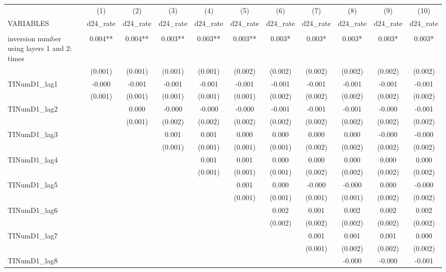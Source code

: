 \begin{tabular}{lcccccccccc} \hline
 & (1) & (2) & (3) & (4) & (5) & (6) & (7) & (8) & (9) & (10) \\
VARIABLES & d24\_rate & d24\_rate & d24\_rate & d24\_rate & d24\_rate & d24\_rate & d24\_rate & d24\_rate & d24\_rate & d24\_rate \\ \hline
 &  &  &  &  &  &  &  &  &  &  \\
inversion number using layers 1 and 2: times & 0.004** & 0.004** & 0.003** & 0.003** & 0.003** & 0.003* & 0.003* & 0.003* & 0.003* & 0.003* \\
 & (0.001) & (0.001) & (0.001) & (0.001) & (0.002) & (0.002) & (0.002) & (0.002) & (0.002) & (0.002) \\
TINumD1\_lag1 & -0.000 & -0.001 & -0.001 & -0.001 & -0.001 & -0.001 & -0.001 & -0.001 & -0.001 & -0.001 \\
 & (0.001) & (0.001) & (0.001) & (0.001) & (0.001) & (0.002) & (0.002) & (0.002) & (0.002) & (0.002) \\
TINumD1\_lag2 &  & 0.000 & -0.000 & -0.000 & -0.000 & -0.001 & -0.001 & -0.001 & -0.000 & -0.001 \\
 &  & (0.001) & (0.002) & (0.002) & (0.002) & (0.002) & (0.002) & (0.002) & (0.002) & (0.002) \\
TINumD1\_lag3 &  &  & 0.001 & 0.001 & 0.000 & 0.000 & 0.000 & 0.000 & -0.000 & -0.000 \\
 &  &  & (0.001) & (0.001) & (0.001) & (0.001) & (0.002) & (0.002) & (0.002) & (0.002) \\
TINumD1\_lag4 &  &  &  & 0.001 & 0.001 & 0.000 & 0.000 & 0.000 & 0.000 & 0.000 \\
 &  &  &  & (0.001) & (0.001) & (0.001) & (0.002) & (0.002) & (0.002) & (0.002) \\
TINumD1\_lag5 &  &  &  &  & 0.001 & 0.000 & -0.000 & -0.000 & 0.000 & -0.000 \\
 &  &  &  &  & (0.001) & (0.001) & (0.001) & (0.001) & (0.002) & (0.002) \\
TINumD1\_lag6 &  &  &  &  &  & 0.002 & 0.001 & 0.002 & 0.002 & 0.002 \\
 &  &  &  &  &  & (0.002) & (0.002) & (0.002) & (0.002) & (0.002) \\
TINumD1\_lag7 &  &  &  &  &  &  & 0.001 & 0.001 & 0.001 & 0.000 \\
 &  &  &  &  &  &  & (0.001) & (0.002) & (0.002) & (0.002) \\
TINumD1\_lag8 &  &  &  &  &  &  &  & -0.000 & -0.000 & -0.001 \\

\end{tabular}
